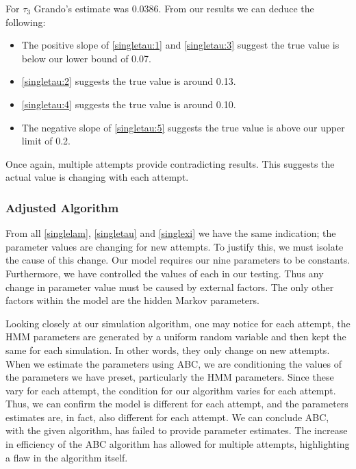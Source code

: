        For $\tau_3$ Grando's estimate was 0.0386. From our results we can deduce the following:
        \begin{itemize}
            \item The positive slope of \ref{singletau:1} and \ref{singletau:3} suggest the true value is below our lower bound of 0.07.
            \item \ref{singletau:2} suggests the true value is around 0.13.
            \item \ref{singletau:4} suggests the true value is around 0.10.
            \item The negative slope of \ref{singletau:5} suggests the true value is above our upper limit of 0.2.
        \end{itemize}
        Once again, multiple attempts provide contradicting results. This suggests the actual value is changing with each attempt.

        \subsubsection{Adjusted Algorithm}
        \label{Replicating_Existing_Rainfall_Model:Replicating_Grando:Results:Adjusted_Algorithm}

        From all \ref{singlelam}, \ref{singletau} and \ref{singlexi} we have the same indication; the parameter values are changing for new attempts. To justify this, we must isolate the cause of this change. Our model requires our nine parameters to be constants. Furthermore, we have controlled the values of each in our testing. Thus any change in parameter value must be caused by external factors. The only other factors within the model are the hidden Markov parameters. 

        Looking closely at our simulation algorithm, one may notice for each attempt, the HMM parameters are generated by a uniform random variable and then kept the same for each simulation. In other words, they only change on new attempts. When we estimate the parameters using ABC, we are conditioning the values of the parameters we have preset, particularly the HMM parameters. Since these vary for each attempt, the condition for our algorithm varies for each attempt. Thus, we can confirm the model is different for each attempt, and the parameters estimates are, in fact, also different for each attempt. 
        We can conclude ABC, with the given algorithm, has failed to provide parameter estimates. The increase in efficiency of the ABC algorithm has allowed for multiple attempts, highlighting a flaw in the algorithm itself. 

